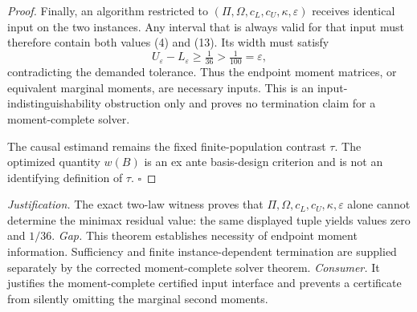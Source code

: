 \documentclass{article}
\begin{document}
\begin{proof}
Finally, an algorithm restricted to \((\Pi,\Omega,c_L,c_U,\kappa,\varepsilon)\) receives identical input on the two instances.  Any interval that is always valid for that input must therefore contain both values (4) and (13).  Its width must satisfy
\[
U_\varepsilon-L_\varepsilon\ge\tfrac1{36}>\tfrac1{100}=\varepsilon,
\]
contradicting the demanded tolerance.  Thus the endpoint moment matrices, or equivalent marginal moments, are necessary inputs.  This is an input-indistinguishability obstruction only and proves no termination claim for a moment-complete solver.

The causal estimand remains the fixed finite-population contrast \(\tau\).  The optimized quantity \(w(B)\) is an ex ante basis-design criterion and is not an identifying definition of \(\tau\).  \(\square\)
\end{proof}
\par\smallskip\noindent \textit{Justification.} The exact two-law witness proves that \(\Pi,\Omega,c_L,c_U,\kappa,\varepsilon\) alone cannot determine the minimax residual value: the same displayed tuple yields values zero and \(1/36\). \textit{Gap.} This theorem establishes necessity of endpoint moment information.  Sufficiency and finite instance-dependent termination are supplied separately by the corrected moment-complete solver theorem. \textit{Consumer.} It justifies the moment-complete certified input interface and prevents a certificate from silently omitting the marginal second moments.
\end{document}
